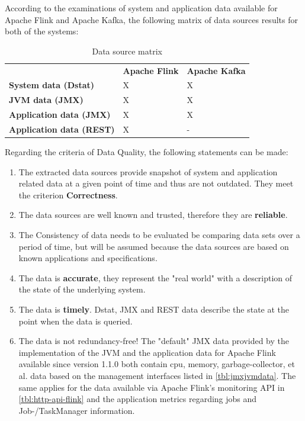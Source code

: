 According to the examinations of system and application data available for Apache Flink and Apache Kafka,
the following matrix of data sources results for both of the systems:

\begin{table}[H]
\begin{tabular}{lll}
 & \textbf{Apache Flink} & \textbf{Apache Kafka} \\
\textbf{System data (Dstat)} & X & X \\
\textbf{JVM data (JMX)} & X & X \\
\textbf{Application data (JMX)} & X & X \\
\textbf{Application data (REST)} & X & - \\
\end{tabular}
\caption{Data source matrix}
\label{tbl:data-source-matrix}
\end{table}

Regarding the criteria of Data Quality, the following statements can be made:

\begin{enumerate}
    \item The extracted data sources provide snapshot of system and application related data at a
    given point of time and thus are not outdated. They meet the criterion \textbf{Correctness}.
    \item The data sources are well known and trusted, therefore they are \textbf{reliable}.
    \item The Consistency of data needs to be evaluated be comparing data sets over a period of time,
    but will be assumed because the data sources are based on known applications and specifications.
    \item The data is \textbf{accurate}, they represent the "real world" with a description of the state of the
    underlying system.
    \item The data is \textbf{timely}. Dstat, JMX and REST data describe the state at the point when the data is
    queried.
    \item The data is not redundancy-free! The "default" JMX data provided by the implementation of the JVM and the
    application data for Apache Flink available since version 1.1.0 both contain cpu, memory, garbage-collector, et al.
    data based on the management interfaces listed in \autoref{tbl:jmxjvmdata}. The same applies for the data available
    via Apache Flink's monitoring API in \autoref{tbl:http-api-flink} and the application metrics regarding jobs and Job-/TaskManager information.
\end{enumerate}

